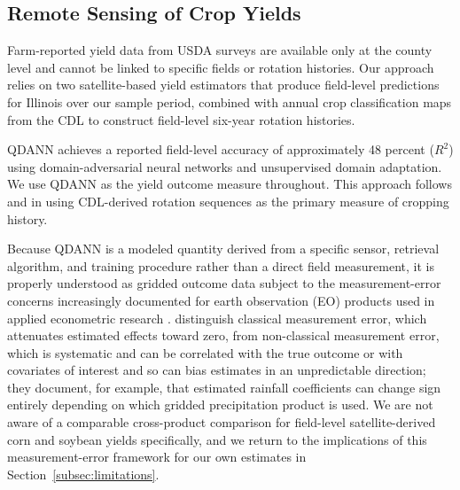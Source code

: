 \documentclass[12pt,letterpaper]{article}
\theoremstyle{remark}
\theoremstyle{remark}
\theoremstyle{plain}
\theoremstyle{definition}
\begin{document}
\subsection{\label{subsec:remote_sensing}Remote Sensing of Crop Yields}

Farm-reported yield data from USDA surveys are available only at the county level and cannot be linked to specific fields or rotation histories. Our approach relies on two satellite-based yield estimators that produce field-level predictions for Illinois over our sample period, combined with annual crop classification maps from the CDL to construct field-level six-year rotation histories.

QDANN \citep{Ma2024} achieves a reported field-level accuracy of approximately 48 percent ($R^2$) using domain-adversarial neural networks and unsupervised domain adaptation. We use QDANN as the yield outcome measure throughout. This approach follows \citet{Pates2025} and \citet{socolar2021} in using CDL-derived rotation sequences as the primary measure of cropping history.

Because QDANN is a modeled quantity derived from a specific sensor, retrieval algorithm, and training procedure rather than a direct field measurement, it is properly understood as gridded outcome data subject to the measurement-error concerns increasingly documented for earth observation (EO) products used in applied econometric research \citep{Benami2026}. \citet{Benami2026} distinguish classical measurement error, which attenuates estimated effects toward zero, from non-classical measurement error, which is systematic and can be correlated with the true outcome or with covariates of interest and so can bias estimates in an unpredictable direction; they document, for example, that estimated rainfall coefficients can change sign entirely depending on which gridded precipitation product is used. We are not aware of a comparable cross-product comparison for field-level satellite-derived corn and soybean yields specifically, and we return to the implications of this measurement-error framework for our own estimates in Section~\ref{subsec:limitations}.
    
\end{document}
